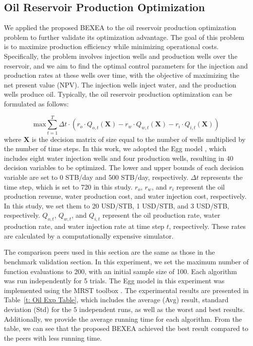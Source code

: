 \documentclass[review]{elsarticle}
\begin{document}
\subsection{Oil Reservoir Production Optimization}
We applied the proposed BEXEA to the oil reservoir production optimization problem to further validate its optimization advantage. The goal of this problem is to maximize production efficiency while minimizing operational costs. Specifically, the problem involves injection wells and production wells over the reservoir, and we aim to find the optimal control parameters for the injection and production rates at these wells over time, with the objective of maximizing the net present value (NPV). The injection wells inject water, and the production wells produce oil. Typically, the oil reservoir production optimization can be formulated as follows:

\begin{equation}
    \text{max} \sum_{t=1}^{T} \Delta t \cdot \left( r_o \cdot Q_{o,t}(\boldsymbol{X}) - r_w \cdot Q_{w,t}(\boldsymbol{X}) - r_i \cdot Q_{i,t}(\boldsymbol{X}) \right) 
\end{equation}
where $\boldsymbol{X}$ is the decision matrix of size equal to the number of wells multiplied by the number of time steps. In this work, we adopted the Egg model \cite{jansen2014egg}, which includes eight water injection wells and four production wells, resulting in 40 decision variables to be optimized. The lower and upper bounds of each decision variable are set to 0 STB/day and 500 STB/day, respectively. $\Delta t$ represents the time step, which is set to 720 in this study. $r_o$, $r_w$, and $r_i$ represent the oil production revenue, water production cost, and water injection cost, respectively. In this study, we set them to 20 USD/STB, 1 USD/STB, and 3 USD/STB, respectively. $Q_{o,t}$, $Q_{w,t}$, and $Q_{i,t}$ represent the oil production rate, water production rate, and water injection rate at time step $t$, respectively. These rates are calculated by a computationally expensive simulator.

The comparison peers used in this section are the same as those in the benchmark validation section. In this experiment, we set the maximum number of function evaluations to 200, with an initial sample size of 100. Each algorithm was run independently for 5 trials. The Egg model in this experiment was implemented using the MRST toolbox \cite{lie2019introduction}. The experimental results are presented in Table~\ref{t: Oil Exp Table}, which includes the average (Avg) result, standard deviation (Std) for the 5 independent runs, as well as the worst and best results. Additionally, we provide the average running time for each algorithm. From the table, we can see that the proposed BEXEA achieved the best result compared to the peers with less running time.
\end{document}
